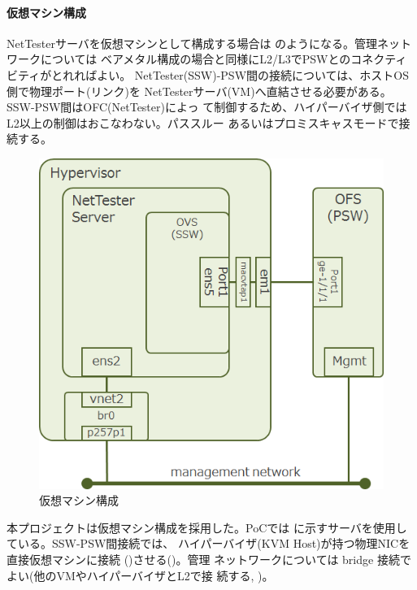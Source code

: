 \paragraph{仮想マシン構成}
NetTesterサーバを仮想マシンとして構成する場合は
のようになる。管理ネットワークについては
ベアメタル構成の場合と同様にL2/L3でPSWとのコネクティビティがとれればよい。
NetTester(SSW)-PSW間の接続については、ホストOS側で物理ポート(リンク)を
NetTesterサーバ(VM)へ直結させる必要がある。SSW-PSW間はOFC(NetTester)によっ
て制御するため、ハイパーバイザ側ではL2以上の制御はおこなわない。パススルー
あるいはプロミスキャスモードで接続する。

\begin{figure}[h]
 \centering
 \includegraphics[scale=0.6]{img/nettester-deploy-vm.png}
 \caption{仮想マシン構成}
 \label{fig:nettester-deploy-vm}
\end{figure}

本プロジェクトは仮想マシン構成を採用した。PoCでは
に示すサーバを使用している。SSW-PSW間接続では、
ハイパーバイザ(KVM Host)が持つ物理NICを直接仮想マシンに接続
()させる()。管理
ネットワークについては bridge 接続でよい(他のVMやハイパーバイザとL2で接
続する, )。

